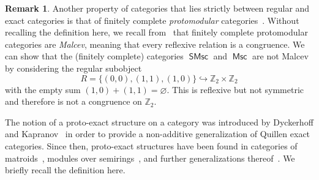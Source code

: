 \documentclass[reqno]{amsart}
\newcommand{\cat}[1]{\ensuremath{\mathsf{#1}}}
\DeclareMathOperator{\Msc}{\cat{Msc}}
\DeclareMathOperator{\SMsc}{\cat{SMsc}}
\newcommand{\Z}{\mathbb{Z}}
\numberwithin{equation}{section}
\theoremstyle{plain}
\theoremstyle{definition}
\newtheorem{remark}[equation]{Remark}
\begin{document}
\begin{remark}\label{rem:malcev}
Another property of categories that lies strictly between regular and exact categories is that of finitely complete \emph{protomodular} categories~\cite{Bourn}. Without recalling the definition here, we recall from~\cite[Theorem~3.18]{BournGran} that finitely complete protomodular categories are \emph{Malcev}, meaning that every reflexive relation is a congruence. 
We can show that the (finitely complete) categories $\SMsc$ and $\Msc$ are not Malcev by considering the regular subobject
\[
R = \{(0, 0), (1, 1), (1, 0)\} \hookrightarrow \Z_2 \times \Z_2
\]
with the empty sum $(1,0) + (1,1) = \varnothing$. This is reflexive but not symmetric and therefore is not a congruence on $\Z_2$. 
\end{remark}


The notion of a proto-exact structure on a category was introduced by Dyckerhoff and Kapranov~\cite[\S 2.4]{DK} in order to provide a non-additive generalization of Quillen exact categories. Since then, proto-exact structures have been found in categories of matroids~\cite{EJS}, modules over semirings~\cite{JST}, and further generalizations thereof~\cite{JSW}.
We briefly recall the definition here.
\end{document}
